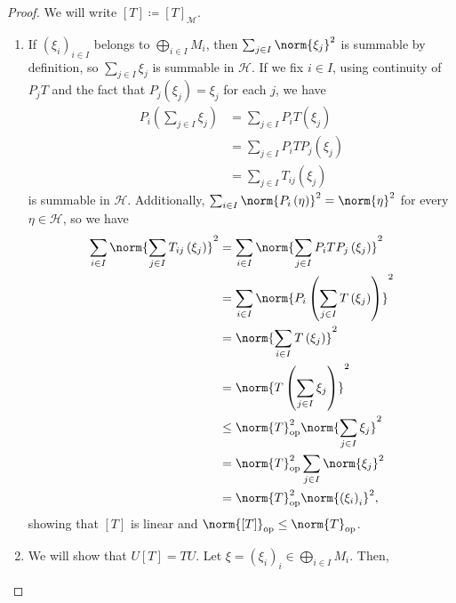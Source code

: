 \documentclass[10pt]{mypackage}
\begin{document}
\begin{proof}
  We will write $\left[T\right] \coloneq \left[T\right]_{\mathcal{M}}$.
  \begin{enumerate}[(1)]
    \item If $\left(\xi_i\right)_{i\in I}$ belongs to $\bigoplus_{i\in I}M_i$, then $\sum_{j\in I}\norm{\xi_j}^2$ is summable by definition, so $\sum_{j\in I}\xi_j$ is summable in $\mathcal{H}$. If we fix $i\in I$, using continuity of $P_jT$ and the fact that $P_j\left(\xi_j\right) = \xi_j$ for each $j$, we have
      \begin{align*}
        P_i\left(\sum_{j\in I}\xi_j\right) &= \sum_{j\in I}P_iT\left(\xi_j\right)\\
                                           &= \sum_{j\in I}P_iTP_j\left(\xi_j\right)\\
                                           &= \sum_{j\in I}T_{ij}\left(\xi_j\right)
      \end{align*}
      is summable in $\mathcal{H}$. Additionally, $\sum_{i\in I}\norm{P_i\left(\eta\right)}^2 = \norm{\eta}^2$ for every $\eta \in \mathcal{H}$, so we have
      \begin{align*}
        \sum_{i\in I}\norm{\sum_{j\in I}T_{ij}\left(\xi_j\right)}^2 &= \sum_{i\in I}\norm{\sum_{j\in I}P_iTP_j\left(\xi_j\right)}^2\\
                                                                    &= \sum_{i\in I}\norm{P_i\left(\sum_{j\in I}T\left(\xi_j\right)\right)}^2\\
                                                                    &= \norm{\sum_{i\in I}T\left(\xi_j\right)}^2\\
                                                                    &= \norm{T\left(\sum_{j\in I}\xi_j\right)}^2\\
                                                                    &\leq \norm{T}_{\text{op}}^2 \norm{\sum_{j\in I}\xi_j}^2\\
                                                                    &= \norm{T}_{\text{op}}^2\sum_{j\in I}\norm{\xi_j}^2\\
                                                                    &= \norm{T}_{\text{op}}^2\norm{\left(\xi_i\right)_i}^2,
      \end{align*}
      showing that $\left[T\right]$ is linear and $\norm{\left[T\right]}_{\text{op}}\leq \norm{T}_{\text{op}}$.
    \item We will show that $U\left[T\right] = TU$. Let $\xi = \left(\xi_i\right)_i\in \bigoplus_{i\in I}M_i$. Then,

\end{enumerate}
\end{proof}
\end{document}

